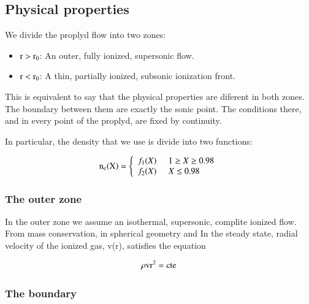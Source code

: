 \documentclass{article}
\begin{document}
\subsection{Physical properties}
\label{cap:density}

We divide the proplyd flow into two zones:

\begin{itemize}
  \item{$\rm r > r_0$: An outer, fully ionized, supersonic flow.}
    \item{$\rm r < r_0$: A thin, partially ionized, subsonic ionization front.}
\end{itemize}

This is equivalent to say that the physical properties are diferent in both zones. The boundary between them are exactly the sonic point. The conditions there, and in every point of the proplyd, are fixed by continuity.

In particular, the density that we use is divide into two functions: 

\begin{equation}
  \rm n_e(X) = \left\lbrace
    \begin{array}{l}
      f_1(X) \;\;\;\;\; 1 \ge X \ge 0.98 \\
      f_2(X) \;\;\;\;\;  X \le 0.98 \\
    \end{array}
  \right.
\end{equation}

\subsubsection{The outer zone}
\label{cap:outer}

In the outer zone we assume an isothermal, supersonic, complite ionized flow. From mass conservation, in spherical geometry and In the steady state, radial velocity of the ionized gas, v(r),
satisfies the equation


\begin{equation}
  \rm \rho v r^2 = cte
\end{equation}

\subsubsection{The boundary}
\label{cap:boundary}
\end{document}
